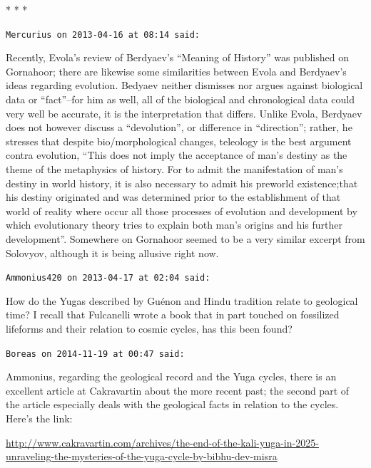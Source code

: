 \begin{center}* * *\end{center}

\begin{footnotesize}
\begin{sffamily}
\texttt{Mercurius on 2013-04-16 at 08:14 said:}

Recently, Evola's review of Berdyaev's ``Meaning of History'' was published on Gornahoor; there are likewise some similarities between Evola and Berdyaev's ideas regarding evolution. Bedyaev neither dismisses nor argues against biological data or ``fact''--for him as well, all of the biological and chronological data could very well be accurate, it is the interpretation that differs. Unlike Evola, Berdyaev does not however discuss a ``devolution'', or difference in ``direction''; rather, he stresses that despite bio/morphological changes, teleology is the best argument contra evolution, ``This does not imply the acceptance of man's destiny as the theme of the metaphysics of history. For to admit the manifestation of man's destiny in world history, it is also necessary to admit his preworld existence;that his destiny originated and was determined prior to the establishment of that world of reality where occur all those processes of evolution and development by which evolutionary theory tries to explain both man's origins and his further development''. Somewhere on Gornahoor seemed to be a very similar excerpt from Solovyov, although it is being allusive right now.

\hfill

\texttt{Ammonius420 on 2013-04-17 at 02:04 said:}

How do the Yugas described by Guénon and Hindu tradition relate to geological time? I recall that Fulcanelli wrote a book that in part touched on fossilized lifeforms and their relation to cosmic cycles, has this been found?

\hfill

\texttt{Boreas on 2014-11-19 at 00:47 said:}

Ammonius, regarding the geological record and the Yuga cycles, there is an excellent article at Cakravartin about the more recent past; the second part of the article especially deals with the geological facts in relation to the cycles. Here's the link:

\url{http://www.cakravartin.com/archives/the-end-of-the-kali-yuga-in-2025-unraveling-the-mysteries-of-the-yuga-cycle-by-bibhu-dev-misra}


\hfill


\end{sffamily}
\end{footnotesize}
